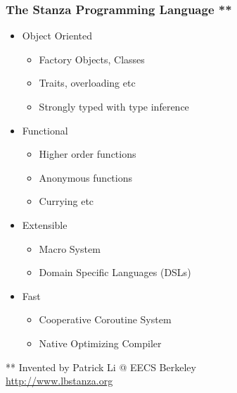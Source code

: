 \documentclass[xcolor=pdflatex,dvipsnames,table]{beamer}
\begin{document}
\begin{frame}[fragile]
\frametitle{The Stanza Programming Language **}



\begin{itemize}
\item Object Oriented
\begin{itemize}
\item Factory Objects, Classes
\item Traits, overloading etc
\item Strongly typed with type inference
\end{itemize}
\item Functional
\begin{itemize}
\item Higher order functions
\item Anonymous functions
\item Currying etc
\end{itemize}
\item Extensible
\begin{itemize}
\item Macro System
\item Domain Specific Languages (DSLs)
\end{itemize}
\item Fast
\begin{itemize}
\item Cooperative Coroutine System
\item Native Optimizing Compiler
\end{itemize}
\end{itemize}

** Invented by Patrick Li @ EECS Berkeley \\
\url{http://www.lbstanza.org}



\end{frame}
\end{document}
